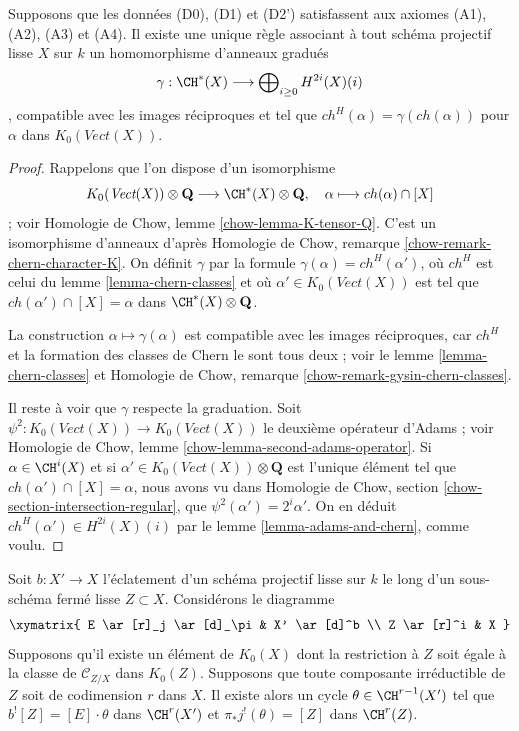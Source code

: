 \begin{lemma}
\label{lemma-cycle-classes}
Supposons que les données (D0), (D1) et (D2') satisfassent aux axiomes (A1), (A2), (A3) et (A4).
Il existe une unique règle associant à tout schéma projectif lisse $X$ sur $k$
un homomorphisme d'anneaux gradués
$$
\gamma : \CH^*(X) \longrightarrow \bigoplus\nolimits_{i \geq 0} H^{2i}(X)(i)
$$,
compatible avec les images réciproques et tel que $ch^H(\alpha) = \gamma(ch(\alpha))$
pour $\alpha$ dans $K_0(\textit{Vect}(X))$.
\end{lemma}

\begin{proof}
Rappelons que l'on dispose d'un isomorphisme
$$
K_0(\textit{Vect}(X)) \otimes \mathbf{Q}
\longrightarrow \CH^*(X) \otimes \mathbf{Q},\quad
\alpha \longmapsto ch(\alpha) \cap [X]
$$ ;
voir Homologie de Chow, lemme \ref{chow-lemma-K-tensor-Q}. C'est un isomorphisme
d'anneaux d'après Homologie de Chow, remarque \ref{chow-remark-chern-character-K}.
On définit $\gamma$ par la formule $\gamma(\alpha) = ch^H(\alpha')$,
où $ch^H$ est celui du lemme \ref{lemma-chern-classes} et où
$\alpha' \in K_0(\textit{Vect}(X))$ est tel que
$ch(\alpha') \cap [X] = \alpha$ dans $\CH^*(X) \otimes \mathbf{Q}$.

\medskip\noindent
La construction $\alpha \mapsto \gamma(\alpha)$ est compatible
avec les images réciproques, car $ch^H$ et la formation des classes de Chern
le sont tous deux ; voir
le lemme \ref{lemma-chern-classes} et
Homologie de Chow, remarque \ref{chow-remark-gysin-chern-classes}.

\medskip\noindent
Il reste à voir que $\gamma$ respecte la graduation.
Soit $\psi^2 : K_0(\textit{Vect}(X)) \to K_0(\textit{Vect}(X))$
le deuxième opérateur d'Adams ; voir Homologie de Chow,
lemme \ref{chow-lemma-second-adams-operator}.
Si $\alpha \in \CH^i(X)$ et si
$\alpha' \in K_0(\textit{Vect}(X)) \otimes \mathbf{Q}$
est l'unique élément tel que $ch(\alpha') \cap [X] = \alpha$,
nous avons vu dans
Homologie de Chow, section \ref{chow-section-intersection-regular},
que $\psi^2(\alpha') = 2^i \alpha'$.
On en déduit $ch^H(\alpha') \in H^{2i}(X)(i)$
par le lemme \ref{lemma-adams-and-chern}, comme voulu.
\end{proof}

\begin{lemma}
\label{lemma-divide-pullback-good-blowing-up}
Soit $b : X' \to X$ l'éclatement d'un schéma projectif lisse
sur $k$ le long d'un sous-schéma fermé lisse $Z \subset X$.
Considérons le diagramme
$$
\xymatrix{
E \ar[r]_j \ar[d]_\pi & X' \ar[d]^b \\
Z \ar[r]^i & X
}
$$
Supposons qu'il existe un élément de $K_0(X)$ dont la restriction à
$Z$ soit égale à la classe de $\mathcal{C}_{Z/X}$ dans $K_0(Z)$.
Supposons que toute composante irréductible de $Z$ soit de codimension $r$ dans $X$.
Il existe alors un cycle $\theta \in \CH^{r - 1}(X')$
tel que $b^![Z] = [E] \cdot \theta$ dans $\CH^r(X')$ et
$\pi_*j^!(\theta) = [Z]$ dans $\CH^r(Z)$.
\end{lemma}

